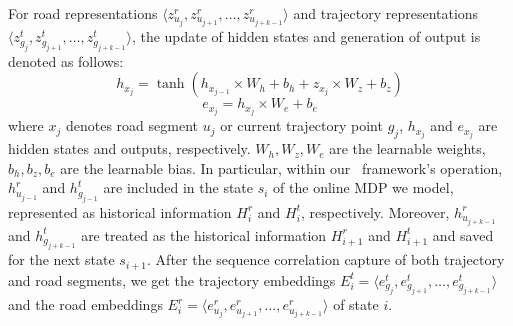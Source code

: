 For road representations $\langle z_{u_j}^{r}, z_{u_{j+1}}^{r}, \ldots, z_{u_{j+k-1}}^{r} \rangle$ and trajectory representations $\langle z_{g_j}^{t}, z_{g_{j+1}}^{t}, \ldots, z_{g_{j+k-1}}^{t} \rangle$, the update of hidden states and generation of output is denoted as follows:
\begin{equation}
h_{x_j} = \tanh(h_{x_{j-1}} \times {W}_{h} + b_{h} + z_{x_j} \times {W}_{z} + b_{z})
\end{equation}
\begin{equation}
e_{x_j} = h_{x_j} \times {W}_{e} + b_{e}
\end{equation}
where $x_j$ denotes road segment $u_j$ or current trajectory point $g_j$, $h_{x_j}$ and $e_{x_j}$ are hidden states and outputs, respectively. ${W}_h, {W}_z, {W}_e$ are the learnable weights, $b_h, b_z, b_e$ are the learnable bias. In particular, within our \modelName~framework's operation, $h_{u_{j-1}}^r$ and $h_{g_{j-1}}^t$ are included in the state $s_i$ of the online MDP we model, represented as historical information $H_i^r$ and $H_i^t$, respectively. Moreover, $h_{u_{j+k-1}}^r$ and $h_{g_{j+k-1}}^t$ are treated as the historical information $H_{i+1}^r$ and $H_{i+1}^t$ and saved for the next state $s_{i+1}$. After the sequence correlation capture of both trajectory and road segments, we get the trajectory embeddings $E_i^t = \langle e_{g_j}^t, e_{g_{j+1}}^t, \ldots, e_{g_{j+k-1}}^t \rangle$ and the road embeddings $E_i^r = \langle e_{u_j}^r, e_{u_{j+1}}^r, \ldots, e_{u_{j+k-1}}^r \rangle$ of state $i$.

